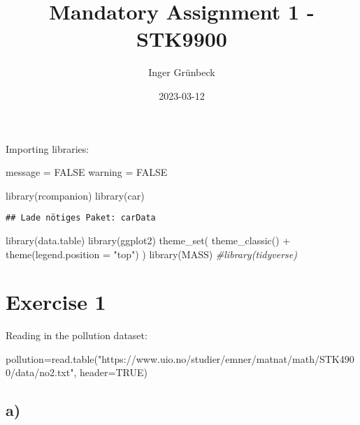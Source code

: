 \documentclass[
]{article}
\title{Mandatory Assignment 1 - STK9900}
\author{Inger Grünbeck}
\date{2023-03-12}
\newenvironment{Shaded}{\begin{snugshade}}{\end{snugshade}}
\newcommand{\AttributeTok}[1]{\textcolor[rgb]{0.77,0.63,0.00}{#1}}
\newcommand{\CommentTok}[1]{\textcolor[rgb]{0.56,0.35,0.01}{\textit{#1}}}
\newcommand{\ConstantTok}[1]{\textcolor[rgb]{0.00,0.00,0.00}{#1}}
\newcommand{\FunctionTok}[1]{\textcolor[rgb]{0.00,0.00,0.00}{#1}}
\newcommand{\NormalTok}[1]{#1}
\newcommand{\OtherTok}[1]{\textcolor[rgb]{0.56,0.35,0.01}{#1}}
\newcommand{\SpecialCharTok}[1]{\textcolor[rgb]{0.00,0.00,0.00}{#1}}
\newcommand{\StringTok}[1]{\textcolor[rgb]{0.31,0.60,0.02}{#1}}
\begin{document}
\maketitle

Importing libraries:

\begin{Shaded}
\begin{Highlighting}[]
\NormalTok{message }\OtherTok{=} \ConstantTok{FALSE}
\NormalTok{warning }\OtherTok{=} \ConstantTok{FALSE}

\FunctionTok{library}\NormalTok{(rcompanion)}
\FunctionTok{library}\NormalTok{(car)}
\end{Highlighting}
\end{Shaded}

\begin{verbatim}
## Lade nötiges Paket: carData
\end{verbatim}

\begin{Shaded}
\begin{Highlighting}[]
\FunctionTok{library}\NormalTok{(data.table)}
\FunctionTok{library}\NormalTok{(ggplot2)}
\FunctionTok{theme\_set}\NormalTok{(}
  \FunctionTok{theme\_classic}\NormalTok{() }\SpecialCharTok{+} 
    \FunctionTok{theme}\NormalTok{(}\AttributeTok{legend.position =} \StringTok{"top"}\NormalTok{)}
\NormalTok{  )}
\FunctionTok{library}\NormalTok{(MASS)}
\CommentTok{\#library(tidyverse)}
\end{Highlighting}
\end{Shaded}

\hypertarget{exercise-1}{%
\section{Exercise 1}\label{exercise-1}}

Reading in the pollution dataset:

\begin{Shaded}
\begin{Highlighting}[]
\NormalTok{pollution}\OtherTok{=}\FunctionTok{read.table}\NormalTok{(}\StringTok{"https://www.uio.no/studier/emner/matnat/math/STK4900/data/no2.txt"}\NormalTok{, }\AttributeTok{header=}\ConstantTok{TRUE}\NormalTok{)}
\end{Highlighting}
\end{Shaded}

\hypertarget{a}{%
\subsection{a)}\label{a}}
\end{document}
